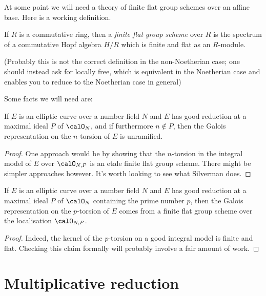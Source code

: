 At some point we will need a theory of finite flat group schemes over an affine base. Here
is a working definition.

\begin{definition}\label{finite_flat_group_scheme} If $R$ is a commutative ring, then
  a \emph{finite flat group scheme} over $R$ is the spectrum of a commutative Hopf algebra $H/R$
  which is finite and flat as an $R$-module.
\end{definition}

(Probably this is not the correct definition in the non-Noetherian case; one should instead ask for locally free, which is equivalent in the Noetherian case and enables you to reduce to the Noetherian case in general)

Some facts we will need are:

\begin{theorem}\label{good_reduction_implies_unramified}\notready If $E$ is an elliptic curve over a number
  field $N$ and $E$ has good reduction at a maximal ideal $P$ of $\calO_N$, and if furthermore
  $n\not\in P$, then the Galois representation on the $n$-torsion of $E$ is unramified.
\end{theorem}
\begin{proof}
  One approach would be by showing that the $n$-torsion in the integral model of $E$ over $\calO_{N,P}$
  is an etale finite flat group scheme. There might be simpler approaches however. It's worth looking to see what Silverman does.
\end{proof}

\begin{theorem}\label{good_reduction_implies_flat}\notready If $E$ is an elliptic curve over a number field
  $N$ and $E$ has good reduction at a maximal ideal $P$ of $\calO_N$ containing the prime number $p$,
  then the Galois representation on the $p$-torsion of $E$ comes from a finite flat group scheme
  over the localisation $\calO_{N,P}$.
\end{theorem}
\begin{proof}
  Indeed, the kernel of the $p$-torsion on a good integral model is finite and flat.
  Checking this claim formally will probably involve a fair amount of work.
\end{proof}

\section{Multiplicative reduction}

